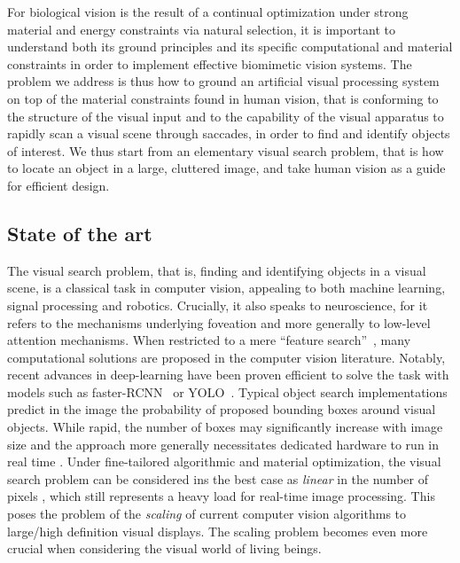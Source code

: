 For biological vision is the result of a continual optimization under strong material and energy constraints via natural selection, it is important to understand both its ground principles and its specific computational and material constraints in order to implement effective biomimetic vision systems.
The problem we address is thus how to ground an artificial visual processing system on top of
the material constraints found in human vision, that is conforming to the structure of the visual input and to the capability of the visual apparatus to rapidly scan a visual scene through saccades, in order to find and identify objects of interest. We thus start from an elementary visual search problem, that is how to locate an object in a large, cluttered image, and take human vision as a guide for efficient design.

%
\subsection{State of the art}

The visual search problem, that is, finding and identifying objects in a visual scene, is a classical task in computer vision, appealing to both
machine learning, signal processing and robotics. Crucially, it also speaks to neuroscience, for it refers to the mechanisms underlying foveation and more generally to low-level attention mechanisms.
When restricted to a mere ``feature search''~\cite{Treisman80}, many computational solutions are proposed in the computer vision literature. Notably, recent advances in deep-learning have been proven efficient to solve the task with models such as faster-RCNN~\cite{Ren17} or YOLO~\cite{Redmon16}. %
Typical object search implementations predict in the image the probability of proposed bounding boxes around visual objects. While rapid, the number of boxes may significantly increase with image size and the approach more generally necessitates dedicated hardware to run in real time \cite{feng2019computer}. Under fine-tailored algorithmic and material optimization, the visual search problem can be considered ins the best case as \emph{linear} in the number of pixels \cite{strengert2006pyramid}, which still represents a heavy load for real-time image processing. This poses the problem of the \emph{scaling} of current computer vision algorithms to large/high definition visual displays. The scaling problem becomes even more crucial when considering the visual world of living beings.

